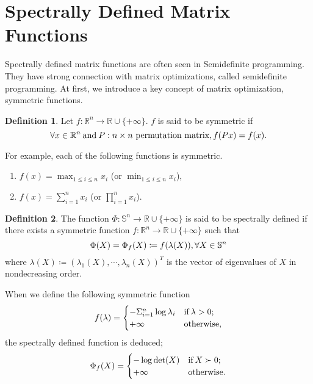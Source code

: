 \documentclass[a4paper,11pt, oneside]{book}
\theoremstyle{definition}
\newtheorem{dfn}{Definition}[section]
\newcommand{\RealNumberSet}{\mathbb{R}}
\newcommand{\NDemenstionalRealEuclideanSpace}{\mathbb{R}^n}
\newcommand{\NDemenstionalRealSymmetricMatrixSpace}{\mathbb{S}^n}
\newcommand{\ExtendedRealValuedFunction}[2]{{#1}: {#2} \to \RealNumberSet \cup \{+\infty\}}
\begin{document}
\section{Spectrally Defined Matrix Functions}

Spectrally defined matrix functions are often seen in Semidefinite programming. They have strong connection with matrix optimizations, called semidefinite programming. At first, we introduce a key concept of matrix optimization, symmetric functions.

\begin{dfn}
  Let $\ExtendedRealValuedFunction{f}{\NDemenstionalRealEuclideanSpace}$.
  $f$ is said to be symmetric if
  \begin{equation}
    \forall x \in \NDemenstionalRealEuclideanSpace \:\text{and}\: P: n \times n \text{ permutation matrix}, f(Px) = f(x). \notag
  \end{equation}
\end{dfn}
For example, each of the following functions is symmetric.
\begin{enumerate}[label=\roman*,align=CenterWithParen]
  \item $f(x) = \max_{1 \leq i \leq n} x_i$ (or $\min_{1 \leq i \leq n} x_i$),
  \item $f(x) = \sum_{i = 1}^{n} x_i$ (or $\prod_{i = 1}^{n} x_i$).
\end{enumerate}

\begin{dfn}
  The function $\ExtendedRealValuedFunction{\Phi}{\NDemenstionalRealSymmetricMatrixSpace}$ is said to be spectrally defined if there exists a symmetric function $\ExtendedRealValuedFunction{f}{\NDemenstionalRealEuclideanSpace}$ such that
  \begin{equation}
    \Phi (X) = \Phi_{f}(X) \coloneqq f(\lambda (X)), \forall X \in \NDemenstionalRealSymmetricMatrixSpace \notag
  \end{equation}
  where $\lambda (X) \coloneqq (\lambda_1 (X), \dotsb , \lambda_n (X))^T$ is the vector of eigenvalues of $X$ in nondecreasing order.
\end{dfn}

When we define the following symmetric function
\begin{equation}
  f(\lambda)=
    \begin{cases}
      - \Sigma_{i = 1}^{n} \log \lambda_i & \text{\rm if}\:\lambda > 0; \\
      +\infty & \text{\rm otherwise}, \notag
    \end{cases}
\end{equation}
the spectrally defined function is deduced;
\begin{equation}
  \Phi_{f}(X)=
    \begin{cases}
      - \log \det (X) & \text{\rm if}\:X \succ 0; \\
      +\infty & \text{\rm otherwise}. \notag
    \end{cases}
\end{equation}
\end{document}
